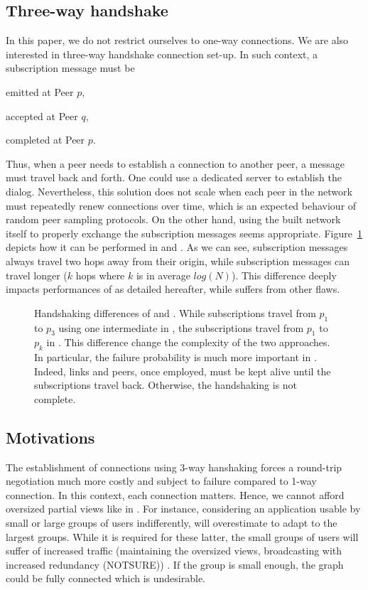 \subsection{Three-way handshake}
In this paper, we do not restrict ourselves to one-way connections. We are 
also interested in three-way handshake connection set-up. In such context, 
a subscription message must be
\begin{inparaenum}[(1)]
\item emitted at Peer $p$,
\item accepted at Peer $q$,
\item completed at Peer $p$.
\end{inparaenum}
Thus, when a peer needs to establish a connection to another peer, a message
must travel back and forth. One could use a dedicated server to establish the
dialog. Nevertheless, this solution does not scale when each peer in the
network must repeatedly renew connections over time, which is an expected
behaviour of random peer sampling protocols. On the other hand, using the built
network itself to properly exchange the subscription messages seems
appropriate. Figure~\ref{fig:handshakeexample} depicts how it can be performed
in \CYCLON{} and \SCAMP{}. As we can see, \CYCLON{} subscription messages
always travel two hops away from their origin, while \SCAMP{} subscription
messages can travel longer ($k$ hops where $k$ is in average $log(N)$).  This
difference deeply impacts performances of \SCAMP{} as detailed hereafter, while
\CYCLON{} suffers from other flaws.

\begin{figure}
  \centering
  
  \caption{\label{fig:handshakeexample}Handshaking differences of \CYCLON{} and
    \SCAMP{}. While subscriptions travel from $p_1$ to $p_3$ using one
    intermediate in \CYCLON{}, the subscriptions travel from $p_1$ to $p_k$ in
    \SCAMP{}. This difference change the complexity of the two approaches. In
    particular, the failure probability is much more important in
    \SCAMP{}. Indeed, links and peers, once employed, must be kept alive until
    the subscriptions travel back. Otherwise, the handshaking is not complete.}
\end{figure}


\subsection{Motivations}
The establishment of connections using 3-way hanshaking forces a round-trip
negotiation much more costly and subject to failure compared to 1-way
connection. In this context, each connection matters. Hence, we cannot afford
oversized partial views like in \CYCLON{}. For instance, considering an
application usable by small or large groups of users indifferently, \CYCLON{}
will overestimate to adapt to the largest groups. While it is required for
these latter, the small groups of users will suffer of increased traffic
(maintaining the oversized views, broadcasting with increased redundancy
(NOTSURE)) . If the group is small enough, the graph could be fully connected
which is undesirable.

